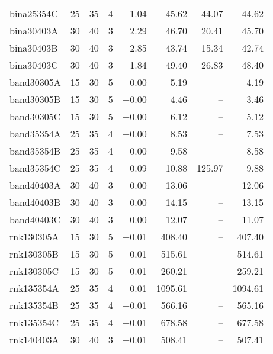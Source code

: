 \begin{scriptsize}
\begin{xtabular*}{\linewidth}{@{\extracolsep{\fill}}lrrrrrrr@{}}
bina25354C & \num{25} & \num{35} & \num{4} & \num{1.04} & \num{45.62} & \num{44.07} & \num{44.62} \\ 
bina30403A & \num{30} & \num{40} & \num{3} & \num{2.29} & \num{46.70} & \num{20.41} & \num{45.70} \\ 
bina30403B & \num{30} & \num{40} & \num{3} & \num{2.85} & \num{43.74} & \num{15.34} & \num{42.74} \\ 
bina30403C & \num{30} & \num{40} & \num{3} & \num{1.84} & \num{49.40} & \num{26.83} & \num{48.40} \\ 
band30305A & \num{15} & \num{30} & \num{5} & \num{0.00} & \num{5.19} & -- & \num{4.19} \\ 
band30305B & \num{15} & \num{30} & \num{5} & \num{-0.00} & \num{4.46} & -- & \num{3.46} \\ 
band30305C & \num{15} & \num{30} & \num{5} & \num{-0.00} & \num{6.12} & -- & \num{5.12} \\ 
band35354A & \num{25} & \num{35} & \num{4} & \num{-0.00} & \num{8.53} & -- & \num{7.53} \\ 
band35354B & \num{25} & \num{35} & \num{4} & \num{-0.00} & \num{9.58} & -- & \num{8.58} \\ 
band35354C & \num{25} & \num{35} & \num{4} & \num{0.09} & \num{10.88} & \num{125.97} & \num{9.88} \\ 
band40403A & \num{30} & \num{40} & \num{3} & \num{0.00} & \num{13.06} & -- & \num{12.06} \\ 
band40403B & \num{30} & \num{40} & \num{3} & \num{0.00} & \num{14.15} & -- & \num{13.15} \\ 
band40403C & \num{30} & \num{40} & \num{3} & \num{0.00} & \num{12.07} & -- & \num{11.07} \\ 
rnk130305A & \num{15} & \num{30} & \num{5} & \num{-0.01} & \num{408.40} & -- & \num{407.40} \\ 
rnk130305B & \num{15} & \num{30} & \num{5} & \num{-0.01} & \num{515.61} & -- & \num{514.61} \\ 
rnk130305C & \num{15} & \num{30} & \num{5} & \num{-0.01} & \num{260.21} & -- & \num{259.21} \\ 
rnk135354A & \num{25} & \num{35} & \num{4} & \num{-0.01} & \num{1095.61} & -- & \num{1094.61} \\ 
rnk135354B & \num{25} & \num{35} & \num{4} & \num{-0.01} & \num{566.16} & -- & \num{565.16} \\ 
rnk135354C & \num{25} & \num{35} & \num{4} & \num{-0.01} & \num{678.58} & -- & \num{677.58} \\ 
rnk140403A & \num{30} & \num{40} & \num{3} & \num{-0.01} & \num{508.41} & -- & \num{507.41} \\ 

\end{xtabular*}
\end{scriptsize}
